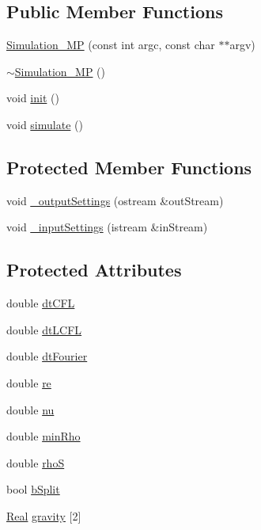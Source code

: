 \subsection*{Public Member Functions}
\begin{DoxyCompactItemize}
\item 
\hyperlink{class_simulation___m_p_a45a08653da9d5bc292cf2c3eb4935fa5}{Simulation\+\_\+\+M\+P} (const int argc, const char $\ast$$\ast$argv)
\item 
\hyperlink{class_simulation___m_p_a09913e4ab45d4a233c273f187d75d12d}{$\sim$\+Simulation\+\_\+\+M\+P} ()
\item 
void \hyperlink{class_simulation___m_p_a73871acbc78c147123049a5be3961a94}{init} ()
\item 
void \hyperlink{class_simulation___m_p_a6c6f5356a6eb20d5c0cbdeec14e88b9f}{simulate} ()
\end{DoxyCompactItemize}
\subsection*{Protected Member Functions}
\begin{DoxyCompactItemize}
\item 
void \hyperlink{class_simulation___m_p_a5672b774fcb947b09896d3a6076dd24b}{\+\_\+output\+Settings} (ostream \&out\+Stream)
\item 
void \hyperlink{class_simulation___m_p_af3c5acc1dbbd2cc01df020c656a1d532}{\+\_\+input\+Settings} (istream \&in\+Stream)
\end{DoxyCompactItemize}
\subsection*{Protected Attributes}
\begin{DoxyCompactItemize}
\item 
double \hyperlink{class_simulation___m_p_ae014690cb61f90c36ec635bbfcada5fc}{dt\+C\+F\+L}
\item 
double \hyperlink{class_simulation___m_p_a96b3effacc522c3fcf6087dfe1ae952e}{dt\+L\+C\+F\+L}
\item 
double \hyperlink{class_simulation___m_p_a6009380cc0d8b248437ad7ebbe50f045}{dt\+Fourier}
\item 
double \hyperlink{class_simulation___m_p_a2f0afbb13c7e228fef62449a400a3f0f}{re}
\item 
double \hyperlink{class_simulation___m_p_a3b6a07ddc688ea1002b53453b270a397}{nu}
\item 
double \hyperlink{class_simulation___m_p_a433b329bcf779db0591f5faf816cada5}{min\+Rho}
\item 
double \hyperlink{class_simulation___m_p_ad93367b143b308c80614b236f8004223}{rho\+S}
\item 
bool \hyperlink{class_simulation___m_p_aefd44ce1cf24ac10066dbb079093b260}{b\+Split}
\item 
\hyperlink{_h_d_f5_dumper_8h_a445a5f0e2a34c9d97d69a3c2d1957907}{Real} \hyperlink{class_simulation___m_p_a538ea54e67dc7fc53f5a7f68e64b9b4a}{gravity} \mbox{[}2\mbox{]}
\end{DoxyCompactItemize}


